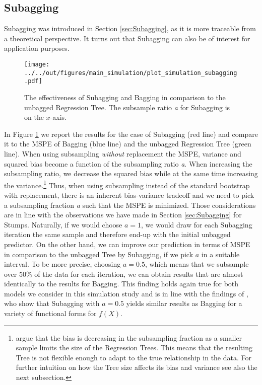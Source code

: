\subsection{Subagging}\label{sub:subagging}
Subagging was introduced in Section \ref{sec:Subagging}, as it is more traceable from a theoretical perspective. It turns out that Subagging can also be of interest for application purposes.
\begin{figure}[t]
\centering
\texttt{[image: ../../out/figures/main\_simulation/plot\_simulation\_subagging.pdf]}
\caption[The effectiveness of Subagging and Bagging in comparison to the unbagged Regression Tree. (Simulation)]{The effectiveness of Subagging and Bagging in comparison to the unbagged Regression Tree. The subsample ratio \textit{a} for Subagging is on the $x$-axis.}
\label{fig:subagging}
\end{figure}
In Figure \ref{fig:subagging} we report the results for the case of Subagging (red line) and compare it to the MSPE of Bagging (blue line) and the unbagged Regression Tree (green line). When using subsampling \textit{without} replacement the MSPE, variance and squared bias become a function of the subsampling ratio \textit{a}. When increasing the subsampling ratio, we decrease the squared bias while at the same time increasing the variance.\footnote{\cite{friedman2007} argue that the bias is decreasing in the subsampling fraction as a smaller sample limits the size of the Regression Trees. This means that the resulting Tree is not flexible enough to adapt to the true relationship in the data. For further intuition on how the Tree size affects its bias and variance see also the next subsection.}
Thus, when using subsampling instead of the standard bootstrap with replacement, there is an inherent bias-variance tradeoff and we need to pick a subsampling fraction \textit{a} such that the MSPE is minimized. Those considerations are in line with the observations we have made in Section \ref{sec:Subagging} for Stumps. \newline
Naturally, if we would choose $a=1$, we would draw for each Subagging iteration the same sample and therefore end-up with the initial unbagged predictor. On the other hand, we can improve our prediction in terms of MSPE in comparison to the unbagged Tree by Subagging, if we pick $a$ in a suitable interval. To be more precise, choosing $a=0.5$, which means that we subsample over 50\% of the data for each iteration, we can obtain results that are almost identically to the results for Bagging. This finding holds again true for both models we consider in this simulation study and is in line with the findings of \cite{friedman2007}, who show that Subagging with $a=0.5$ yields similar results as Bagging for a variety of functional forms for $f(X)$.\newline
